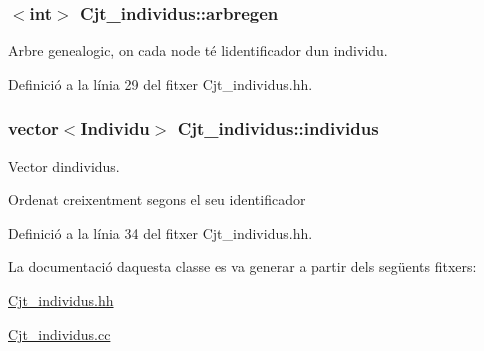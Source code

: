\subsubsection[{\texorpdfstring{arbregen}{arbregen}}]{$<$int$>$ Cjt\+\_\+individus\+::arbregen\hspace{0.3cm}{\ttfamily [private]}}\hypertarget{class_cjt__individus_aa4786868783b8da4233a9b844ad376ce}{}\label{class_cjt__individus_aa4786868783b8da4233a9b844ad376ce}


Arbre genealogic, on cada node té l\textquotesingle{}identificador d\textquotesingle{}un individu. 



Definició a la línia 29 del fitxer Cjt\+\_\+individus.\+hh.

\subsubsection[{\texorpdfstring{individus}{individus}}]{\setlength{\rightskip}{0pt plus 5cm}vector$<${\bf Individu}$>$ Cjt\+\_\+individus\+::individus\hspace{0.3cm}{\ttfamily [private]}}\hypertarget{class_cjt__individus_aa28716121e4fbc5b6a90150748c9fc0b}{}\label{class_cjt__individus_aa28716121e4fbc5b6a90150748c9fc0b}


Vector d\textquotesingle{}individus. 

Ordenat creixentment segons el seu identificador 

Definició a la línia 34 del fitxer Cjt\+\_\+individus.\+hh.



La documentació d\textquotesingle{}aquesta classe es va generar a partir dels següents fitxers\+:\begin{DoxyCompactItemize}
\item 
\hyperlink{_cjt__individus_8hh}{Cjt\+\_\+individus.\+hh}\item 
\hyperlink{_cjt__individus_8cc}{Cjt\+\_\+individus.\+cc}\end{DoxyCompactItemize}
